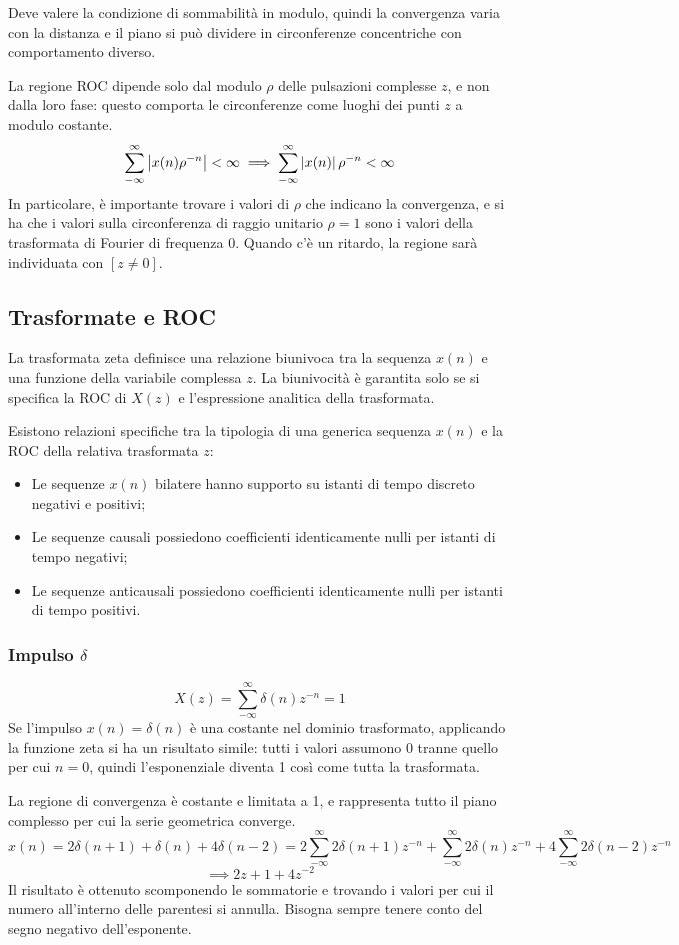 Deve valere la condizione di sommabilità in modulo, quindi la convergenza varia con la distanza e il piano si può dividere in circonferenze concentriche con comportamento diverso. 

La regione ROC dipende solo dal modulo $\rho$ delle pulsazioni complesse $z$, e non dalla loro fase: questo comporta le circonferenze come luoghi dei punti $z$ a modulo costante.
$$ \sum_{-\infty}^{\infty}\left|x(n)\rho^{-n}\right| < \infty \implies  \sum_{-\infty}^{\infty}\left|x(n)\right|\rho^{-n} < \infty$$
In particolare, è importante trovare i valori di $\rho$ che indicano la convergenza, e si ha che i valori sulla circonferenza di raggio unitario $\rho = 1$ sono i valori della trasformata di Fourier di frequenza 0. Quando c'è un ritardo, la regione sarà individuata con $[z \neq 0]$.

\subsection{Trasformate e ROC}
La trasformata zeta definisce una relazione biunivoca tra la sequenza $x(n)$ e una funzione della variabile complessa $z$. La biunivocità è garantita solo se si specifica la ROC di $X(z)$ e l'espressione analitica della trasformata.

Esistono relazioni specifiche tra la tipologia di una generica sequenza $x(n)$ e la ROC della relativa trasformata $z$:
\begin{itemize}
	\item Le sequenze $x(n)$ bilatere hanno supporto su istanti di tempo discreto negativi e positivi;
	\item Le sequenze causali possiedono coefficienti identicamente nulli per istanti di tempo negativi;
	\item Le sequenze anticausali possiedono coefficienti identicamente nulli per istanti di tempo positivi.
\end{itemize}

\subsubsection{Impulso $\delta$}
$$X(z) = \sum_{-\infty}^{\infty} \delta(n) z^{-n} = 1$$
Se l'impulso $x(n) = \delta(n)$ è una costante nel dominio trasformato, applicando la funzione zeta si ha un risultato simile: tutti i valori assumono 0 tranne quello per cui $n = 0$, quindi l'esponenziale diventa 1 così come tutta la trasformata. 

La regione di convergenza è costante e limitata a 1, e rappresenta tutto il piano complesso per cui la serie geometrica converge.
$$x(n) = 2\delta(n+1) + \delta(n) + 4\delta(n-2) = 2\sum_{-\infty}^{\infty}2\delta(n+1)z^{-n} + \sum_{-\infty}^{\infty}2\delta(n)z^{-n} + 4\sum_{-\infty}^{\infty}2\delta(n-2)z^{-n}$$
$$\implies 2z + 1 + 4z^{-2}$$
Il risultato è ottenuto scomponendo le sommatorie e trovando i valori per cui il numero all'interno delle parentesi si annulla. Bisogna sempre tenere conto del segno negativo dell'esponente.

